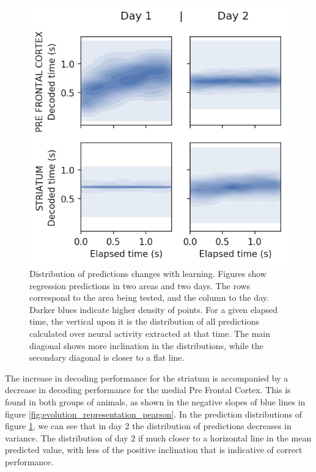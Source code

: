     \begin{figure}[ht]
        \centering
        \includegraphics{figures/single_regression_results_comparing_days.png}
        \caption[Distribution of predictions changes with learning]{Distribution of predictions changes with learning. Figures show regression predictions in two areas and two days. The rows correspond to the area being tested, and the column to the day. Darker blues indicate higher density of points. For a given elapsed time, the vertical upon it is the distribution of all predictions calculated over neural activity extracted at that time. The main diagonal shows more inclination in the distributions, while the secondary diagonal is closer to a flat line.}
        \label{fig:kde_comparison_days}
    \end{figure}
    
    The increase in decoding performance for the striatum is accompanied by a decrease in decoding performance for the medial Pre Frontal Cortex. This is found in both groups of animals, as shown in the negative slopes of blue lines in figure \ref{fig:evolution_representation_pearson}. In the prediction distributions of figure \ref{fig:kde_comparison_days}, we can see that in day 2 the distribution of predictions decreases in variance. The distribution of day 2 if much closer to a horizontal line in the mean predicted value, with less of the positive inclination that is indicative of correct performance.
    
